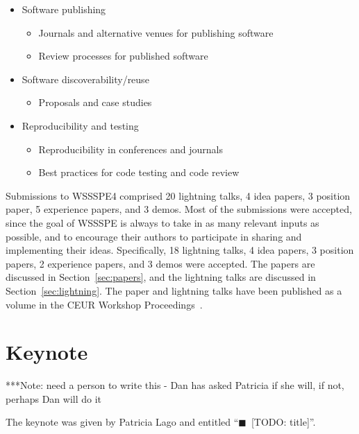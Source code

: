 \documentclass[11pt, oneside]{amsart}
\newcommand{\todo}[1]{{\color{blue}$\blacksquare$~\textsf{[TODO: #1]}}}
\newcommand{\note}[1]{ {\textcolor{blueish}    { ***Note:      #1 }}}
\begin{document}
\begin{itemize}
\item Software publishing
\begin{itemize}
    \item Journals and alternative venues for publishing software
    \item Review processes for published software
\end{itemize}

\item Software discoverability/reuse
\begin{itemize}
    \item Proposals and case studies
\end{itemize}

\item Reproducibility and testing
\begin{itemize}
    \item Reproducibility in conferences and journals
    \item Best practices for code testing and code review
\end{itemize}

\end{itemize}

Submissions to WSSSPE4 comprised
20 lightning talks,
4 idea papers,
3 position paper,
5 experience papers,
and
3 demos.
Most of the submissions were accepted, since the goal of WSSSPE is always to
take in as many relevant inputs as possible, and to encourage their authors to
participate in sharing and implementing their ideas.
Specifically,
18 lightning talks,
4 idea papers,
3 position papers,
2 experience papers,
and
3 demos
were accepted.
The papers are discussed in Section~\ref{sec:papers},
and the lightning talks are discussed in Section~\ref{sec:lightning}.
The paper and lightning talks have been published as a volume in the CEUR Workshop Proceedings~\cite{WSSSPE4-proceedings}.

\section{Keynote}\label{sec:keynote}

\note{need a person to write this - Dan has asked Patricia if she will, if not, perhaps Dan will do it}

The keynote was given by Patricia Lago and entitled ``\todo{title}''.

\end{document}
